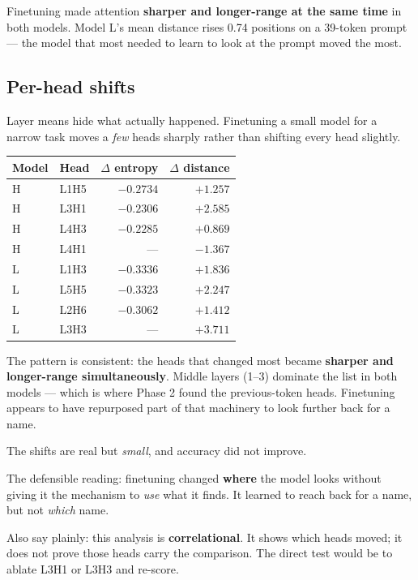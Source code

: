 \documentclass[11pt]{report}
\begin{document}
Finetuning made attention \textbf{sharper and longer-range at the same time} in
both models. Model L's mean distance rises 0.74 positions on a 39-token prompt
--- the model that most needed to learn to look at the prompt moved the most.

\subsection{Per-head shifts}

Layer means hide what actually happened. Finetuning a small model for a narrow
task moves a \emph{few} heads sharply rather than shifting every head slightly.

\begin{center}
\begin{tabular}{@{}llrr@{}}
\toprule
\textbf{Model} & \textbf{Head} & \textbf{$\Delta$ entropy} & \textbf{$\Delta$ distance} \\
\midrule
H & L1H5 & $-0.2734$ & $+1.257$ \\
H & L3H1 & $-0.2306$ & $\mathbf{+2.585}$ \\
H & L4H3 & $-0.2285$ & $+0.869$ \\
H & L4H1 & --- & $-1.367$ \\
\midrule
L & L1H3 & $-0.3336$ & $+1.836$ \\
L & L5H5 & $-0.3323$ & $+2.247$ \\
L & L2H6 & $-0.3062$ & $+1.412$ \\
L & L3H3 & --- & $\mathbf{+3.711}$ \\
\bottomrule
\end{tabular}
\end{center}

The pattern is consistent: the heads that changed most became \textbf{sharper
and longer-range simultaneously}. Middle layers (1--3) dominate the list in both
models --- which is where Phase 2 found the previous-token heads. Finetuning
appears to have repurposed part of that machinery to look further back for a
name.

\begin{warnbox}
The shifts are real but \emph{small}, and accuracy did not improve.

The defensible reading: finetuning changed \textbf{where} the model looks
without giving it the mechanism to \emph{use} what it finds. It learned to reach
back for a name, but not \emph{which} name.

Also say plainly: this analysis is \textbf{correlational}. It shows which heads
moved; it does not prove those heads carry the comparison. The direct test would
be to ablate L3H1 or L3H3 and re-score.
\end{warnbox}
\end{document}
